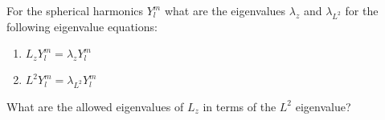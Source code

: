 

\vspace*{\fill}
\centering

For the spherical harmonics $Y_{l}^{m}$ what are the eigenvalues $\lambda_{z}$ and $\lambda_{L^2}$ for the following eigenvalue equations:
\begin{enumerate}
    \item $\displaystyle L_{z}Y_{l}^{m} = \lambda_{z}Y_{l}^{m}$ 
    \item $\displaystyle L^2Y_{l}^{m} = \lambda_{L^2}Y_{l}^{m}$ 
\end{enumerate}

What are the allowed eigenvalues of $L_{z}$ in terms of the $L^2$ eigenvalue?

\centering
\vspace*{\fill}

